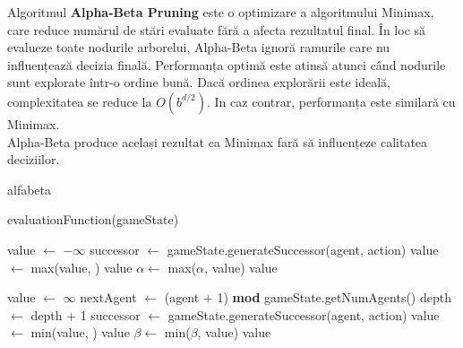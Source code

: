 \par Algoritmul \textbf{Alpha-Beta Pruning} este o optimizare a algoritmului Minimax, care reduce numărul de stări evaluate fără a afecta rezultatul final. În loc să evalueze toate nodurile arborelui, Alpha-Beta ignoră ramurile care nu influențează decizia finală. Performanța optimă este atinsă atunci când nodurile sunt explorate într-o ordine bună. Dacă ordinea explorării este ideală, complexitatea se reduce la $O(b^{d/2})$. In caz contrar, performanța este similară cu Minimax.\\Alpha-Beta produce același rezultat ca Minimax fară să influențeze calitatea deciziilor.

\begin{algorithm}
\caption{alfabeta}
\begin{algorithmic}[1]
        \State \Return evaluationFunction(gameState)
    \EndIf
    
     
        \State value $\gets$ $-\infty$
            \State successor $\gets$ gameState.generateSuccessor(agent, action)
            \State value $\gets$ max(value, )
                \State \Return value 
            \EndIf
            \State $\alpha \gets$ max($\alpha$, value)
        \EndFor
        \State \Return value
        
    \Else {}
        \State value $\gets$ $\infty$
        \State nextAgent $\gets$ (agent + 1) \textbf{mod} gameState.getNumAgents()
            \State depth $\gets$ depth + 1
        \EndIf
            \State successor $\gets$ gameState.generateSuccessor(agent, action)
            \State value $\gets$ min(value, )
                \State \Return value 
            \EndIf
            \State $\beta \gets$ min($\beta$, value)
        \EndFor
        \State \Return value
    \EndIf
\EndFunction
\end{algorithmic}
\end{algorithm}

